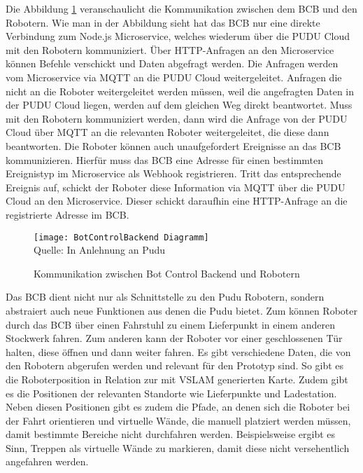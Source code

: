 Die Abbildung \ref{fig:BotControlBackendCommunication} veranschaulicht die Kommunikation zwischen dem \ac{BCB} und den Robotern. Wie man in der Abbildung sieht hat das \ac{BCB} nur eine direkte Verbindung zum Node.js Microservice, welches wiederum über die PUDU Cloud mit den Robotern kommuniziert. Über \gls{HTTP}-Anfragen an den Microservice können Befehle verschickt und Daten abgefragt werden. Die Anfragen werden vom Microservice via \gls{MQTT} an die PUDU Cloud weitergeleitet. Anfragen die nicht an die Roboter weitergeleitet werden müssen, weil die angefragten Daten in der PUDU Cloud liegen, werden auf dem gleichen Weg direkt beantwortet. Muss mit den Robotern kommuniziert werden, dann wird die Anfrage von der PUDU Cloud über \gls{MQTT} an die relevanten Roboter weitergeleitet, die diese dann beantworten. Die Roboter können auch unaufgefordert Ereignisse an das \ac{BCB} kommunizieren. Hierfür muss das \ac{BCB} eine Adresse für einen bestimmten Ereignistyp im Microservice als \gls{Webhook} registrieren. Tritt das entsprechende Ereignis auf, schickt der Roboter diese Information via \gls{MQTT} über die PUDU Cloud an den Microservice. Dieser schickt daraufhin eine HTTP-Anfrage an die registrierte Adresse im \ac{BCB}.

\begin{figure}[H]
\caption{Kommunikation zwischen Bot Control Backend und Robotern}\label{fig:BotControlBackendCommunication}
\texttt{[image: BotControlBackend Diagramm]}
\\
Quelle: In Anlehnung an Pudu \cite[S.~4]{PuduSDK}
\end{figure}

Das \ac{BCB} dient nicht nur als Schnittstelle zu den Pudu Robotern, sondern abstraiert auch neue Funktionen aus denen die Pudu bietet. Zum können Roboter durch das \ac{BCB} über einen Fahrstuhl zu einem Lieferpunkt in einem anderen Stockwerk fahren. Zum anderen kann der Roboter vor einer geschlossenen Tür halten, diese öffnen und dann weiter fahren. Es gibt verschiedene Daten, die von den Robotern abgerufen werden und relevant für den Prototyp sind. So gibt es die Roboterposition in Relation zur mit \ac{VSLAM} generierten Karte. Zudem gibt es die Positionen der relevanten Standorte wie Lieferpunkte und Ladestation. Neben diesen Positionen gibt es zudem die Pfade, an denen sich die Roboter bei der Fahrt orientieren und virtuelle Wände, die manuell platziert werden müssen, damit bestimmte Bereiche nicht durchfahren werden. Beispielsweise ergibt es Sinn, Treppen als virtuelle Wände zu markieren, damit diese nicht versehentlich angefahren werden.

